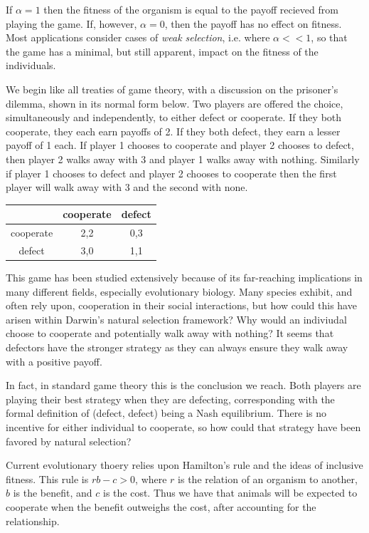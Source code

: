 \documentclass[12pt, AofM.tex]{subfiles}
\begin{document}
If $\alpha=1$ then the fitness of the organism is equal to the payoff recieved from playing the game. If, however, $\alpha=0$, then the payoff has no effect on fitness. Most applications consider cases of \emph{weak selection}, i.e. where $\alpha <<1$, so that the game has a minimal, but still apparent, impact on the fitness of the individuals.

We begin like all treaties of game theory, with a discussion on the prisoner's dilemma, shown in its normal form below. Two players are offered the choice, simultaneously and independently, to either defect or cooperate. If they both cooperate, they each earn payoffs of 2. If they both defect, they earn a lesser payoff of 1 each. If player 1 chooses to cooperate and player 2 chooses to defect, then player 2 walks away with 3 and player 1 walks away with nothing. Similarly if player 1 chooses to defect and player 2 chooses to cooperate then the first player will walk away with 3 and the second with none.  
\begin{center}
    \begin{tabular}{c | c c }
     & cooperate & defect \\
     \hline
     cooperate & 2,2 & 0,3 \\
     defect & 3,0 & 1,1 \\
\end{tabular}
\end{center}
This game has been studied extensively because of its far-reaching implications in many different fields, especially evolutionary biology. Many species exhibit, and often rely upon, cooperation in their social interactions, but how could this have arisen within Darwin's natural selection framework? Why would an indiviudal choose to cooperate and potentially walk away with nothing? It seems that defectors have the stronger strategy as they can always ensure they walk away with a positive payoff.

In fact, in standard game theory this is the conclusion we reach. Both players are playing their best strategy when they are defecting, corresponding with the formal definition of (defect, defect) being a Nash equilibrium. There is no incentive for either individual to cooperate, so how could that strategy have been favored by natural selection? 

Current evolutionary thoery relies upon Hamilton's rule and the ideas of inclusive fitness. This rule is $rb - c>0$, where $r$ is the relation of an organism to another, $b$ is the benefit, and $c$ is the cost. Thus we have that animals will be expected to cooperate when the benefit outweighs the cost, after accounting for the relationship. 
\end{document}
